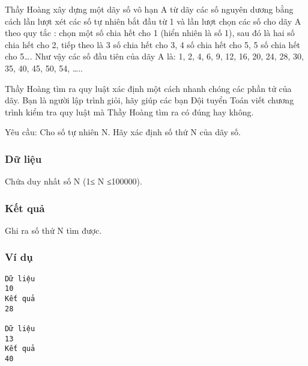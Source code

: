 



   Thầy Hoàng xây dựng một dãy số vô hạn A từ dãy các số nguyên dương bằng cách lần lượt xét các số tự nhiên bắt đầu từ 1 và lần lượt chọn các số cho dãy A theo quy tắc : chọn một số chia hết cho 1 (hiển nhiên là số 1),  sau đó là hai số chia hết cho 2, tiếp theo là 3 số chia hết cho 3, 4 số chia hết cho 5, 5 số chia hết cho 5…. Như vậy các số đầu tiên của dãy A là: 1, 2, 4, 6, 9, 12, 16, 20, 24, 28, 30, 35, 40, 45, 50, 54, …..  

   Thầy Hoàng tìm ra quy luật xác định một cách nhanh chóng các phần tử của dãy. Bạn là người lập trình giỏi, hãy giúp các bạn Đội tuyển Toán viết chương trình kiểm tra quy luật mà Thầy Hoàng tìm ra có đúng hay không.  

   Yêu cầu: Cho số tự nhiên N. Hãy xác định số thứ N của dãy số.  

\subsubsection{   Dữ liệu  }

   Chứa duy nhất số N (1≤ N ≤100000).  

\subsubsection{   Kết quả  }

   Ghi ra số thứ N tìm được.  

\subsubsection{   Ví dụ  }
\begin{verbatim}
Dữ liệu
10
Kết quả
28

Dữ liệu
13
Kết quả
40
\end{verbatim}